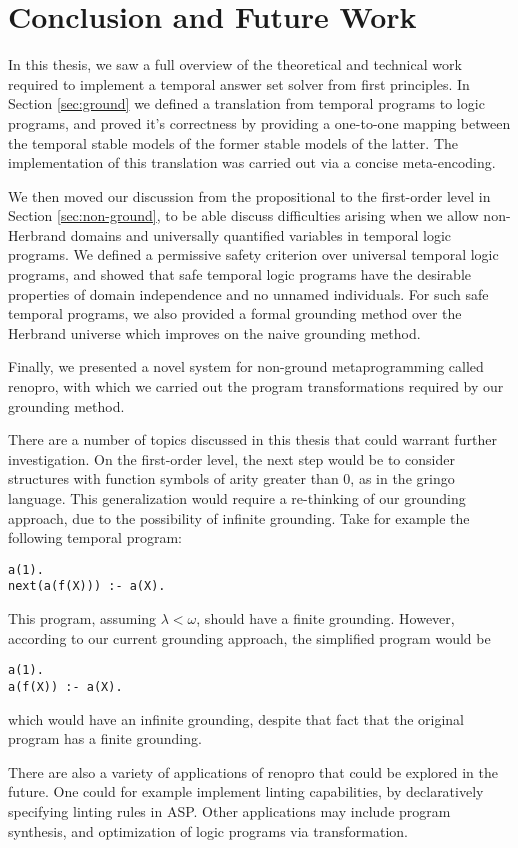\section{Conclusion and Future Work}

In this thesis, we saw a full overview of the theoretical and
technical work required to implement a temporal answer set solver from
first principles. In Section \ref{sec:ground} we defined a translation
from temporal programs to logic programs, and proved it's correctness
by providing a one-to-one mapping between the temporal stable models
of the former stable models of the latter. The implementation of this
translation was carried out via a concise meta-encoding.

We then moved our discussion from the propositional to the first-order
level in Section \ref{sec:non-ground}, to be able discuss difficulties
arising when we allow non-Herbrand domains and universally quantified
variables in temporal logic programs. We defined a permissive safety
criterion over universal temporal logic programs, and showed that safe
temporal logic programs have the desirable properties of domain
independence and no unnamed individuals. For such safe temporal
programs, we also provided a formal grounding method over the Herbrand
universe which improves on the naive grounding method.

Finally, we presented a novel system for non-ground metaprogramming
called renopro, with which we carried out the program transformations
required by our grounding method.

There are a number of topics discussed in this thesis that could
warrant further investigation. On the first-order level, the next step
would be to consider structures with function symbols of arity greater
than 0, as in the gringo language. This generalization would require a
re-thinking of our grounding approach, due to the possibility of
infinite grounding. Take for example the following temporal program:

\begin{lstlisting}[language=clingo,numbers=none]
a(1).
next(a(f(X))) :- a(X).
\end{lstlisting}

This program, assuming $\lambda < \omega$, should have a finite
grounding. However, according to our current grounding approach, the
simplified program would be

\begin{lstlisting}[language=clingo,numbers=none]
a(1).
a(f(X)) :- a(X).
\end{lstlisting}

which would have an infinite grounding, despite that fact that the
original program has a finite grounding.

There are also a variety of applications of renopro that could be
explored in the future. One could for example implement linting
capabilities, by declaratively specifying linting rules in ASP. Other
applications may include program synthesis, and optimization of logic
programs via transformation.
